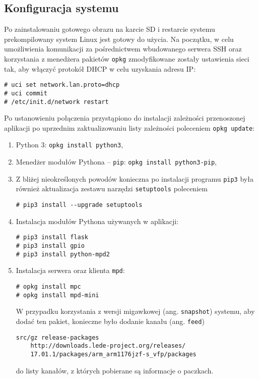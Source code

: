 \documentclass[10pt,a4paper]{article}
\begin{document}
\subsection{Konfiguracja systemu}

Po zainstalowaniu gotowego obrazu na karcie SD i restarcie systemu prekompilowany system Linux
jest gotowy do użycia. Na początku, w celu umożliwienia komunikacji za pośrednictwem wbudowanego
serwera SSH oraz korzystania z menedżera pakietów \texttt{opkg} zmodyfikowane zostały ustawienia
sieci tak, aby włączyć protokół DHCP w celu uzyskania adresu IP:

\begin{lstlisting}[caption=Włączanie klienta DHCP na interfejsie \texttt{lan}]
# uci set network.lan.proto=dhcp
# uci commit
# /etc/init.d/network restart
\end{lstlisting}

Po ustanowieniu połączenia przystąpiono do instalacji zależności przenoszonej aplikacji po
uprzednim zaktualizowaniu listy zależności poleceniem \texttt{opkg update}:

\begin{enumerate}
	\item Python 3: \texttt{opkg install python3},
	\item Menedżer modułów Pythona -- \texttt{pip}: \texttt{opkg install python3-pip},
	\item Z bliżej nieokreślonych powodów konieczna po instalacji programu \texttt{pip3}
		była również aktualizacja zestawu narzędzi \texttt{setuptools} poleceniem
\begin{lstlisting}
# pip3 install --upgrade setuptools
\end{lstlisting}
	\item Instalacja modułów Pythona używanych w aplikacji:
\begin{lstlisting}
# pip3 install flask
# pip3 install gpio
# pip3 install python-mpd2
\end{lstlisting}
	\item Instalacja serwera oraz klienta \texttt{mpd}:
\begin{lstlisting}
# opkg install mpc
# opkg install mpd-mini
\end{lstlisting}
		W przypadku korzystania z wersji migawkowej (ang. \texttt{snapshot}) systemu, aby
		dodać ten pakiet, konieczne było dodanie kanału (ang. \texttt{feed})
\begin{lstlisting}
src/gz release-packages 
	http://downloads.lede-project.org/releases/
	17.01.1/packages/arm_arm1176jzf-s_vfp/packages
\end{lstlisting}
		do listy kanałów, z których pobierane są informacje o paczkach.
\end{enumerate}
\end{document}
